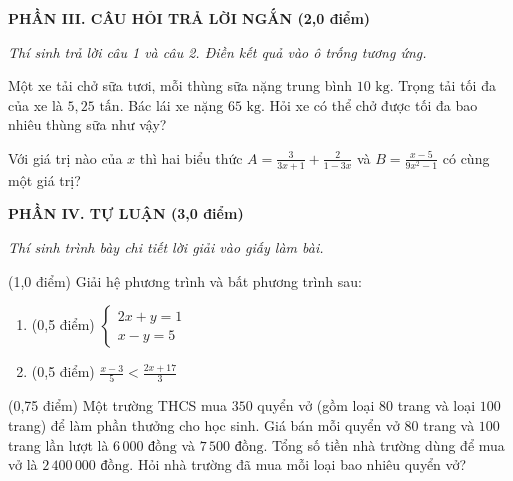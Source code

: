 \documentclass[12pt,a4paper]{article}
\begin{document}
\setcounter{ex}{0}
\noindent\textbf{\large PHẦN III. CÂU HỎI TRẢ LỜI NGẮN (2,0 điểm)}

\textit{Thí sinh trả lời câu 1 và câu 2. Điền kết quả vào ô trống tương ứng.}

\vspace{1mm}
\begin{ex}
Một xe tải chở sữa tươi, mỗi thùng sữa nặng trung bình $10\text{ kg}$. Trọng tải tối đa của xe là $5{,}25\text{ tấn}$. Bác lái xe nặng $65\text{ kg}$. Hỏi xe có thể chở được tối đa bao nhiêu thùng sữa như vậy? 
\end{ex}

\begin{ex}
Với giá trị nào của $x$ thì hai biểu thức $A = \frac{3}{3x+1} + \frac{2}{1-3x}$ và $B = \frac{x-5}{9x^2-1}$ có cùng một giá trị? 
\end{ex}


\setcounter{ex}{0}
\noindent\textbf{\large PHẦN IV. TỰ LUẬN (3,0 điểm)}

\textit{Thí sinh trình bày chi tiết lời giải vào giấy làm bài.}

\vspace{1mm}
\begin{ex} (1,0 điểm)
Giải hệ phương trình và bất phương trình sau:
\begin{enumerate}[label=\textbf{\alph*)}, leftmargin=0.8cm, itemsep=2pt]
\item (0,5 điểm) $\begin{cases} 2x + y = 1 \\ x - y = 5 \end{cases}$
\item (0,5 điểm) $\frac{x - 3}{5} < \frac{2x + 17}{3}$
\end{enumerate}
\end{ex}
\vspace{0.5mm}

\begin{ex} (0,75 điểm)
Một trường THCS mua $350$ quyển vở (gồm loại $80$ trang và loại $100$ trang) để làm phần thưởng cho học sinh. Giá bán mỗi quyển vở $80$ trang và $100$ trang lần lượt là $6\,000\text{ đồng}$ và $7\,500\text{ đồng}$. Tổng số tiền nhà trường dùng để mua vở là $2\,400\,000\text{ đồng}$. Hỏi nhà trường đã mua mỗi loại bao nhiêu quyển vở?
\end{ex}
\vspace{0.5mm}
\end{document}
